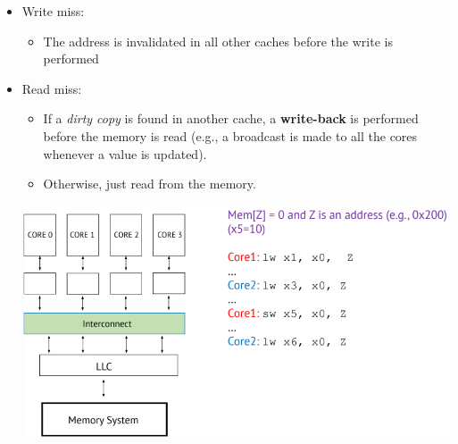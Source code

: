 \documentclass[10pt]{article}
\begin{document}
    \begin{itemize}
        \item Write miss:
        \begin{itemize}
            \item The address is invalidated in all other caches before the write is performed
        \end{itemize}
        \item Read miss:
        \begin{itemize}
            \item If a \textit{dirty copy} is found in another cache, a \textbf{write-back} is performed before the memory is read (e.g., a broadcast is made to all the cores whenever a value is updated).
            \item Otherwise, just read from the memory.
        \end{itemize}
        \begin{center}
            \includegraphics*[scale=0.8]{W8_10.png}
        \end{center}
    \end{itemize}
\end{document}
